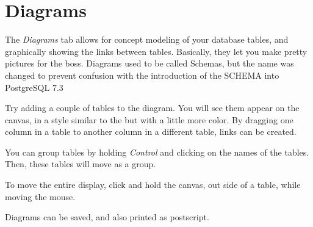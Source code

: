 \section{Diagrams}
The \emph{Diagrams} tab allows for concept modeling of your database tables, 
and graphically showing the links between tables. Basically, they let you 
make pretty pictures for the boss. Diagrams used to be called Schemas, but 
the name was changed to prevent confusion with the introduction of the SCHEMA 
into PostgreSQL 7.3

Try adding a couple of tables to the diagram. You will see them appear on the 
canvas, in a style similar to the 
but with a little more color. By dragging one column in a table to another 
column in a different table, links can be created.

You can group tables by holding \emph{Control} and clicking on the names of 
the tables. Then, these tables will move as a group.

To move the entire display, click and hold the canvas, out side of a table, 
while moving the mouse.

Diagrams can be saved, and also printed as postscript.
